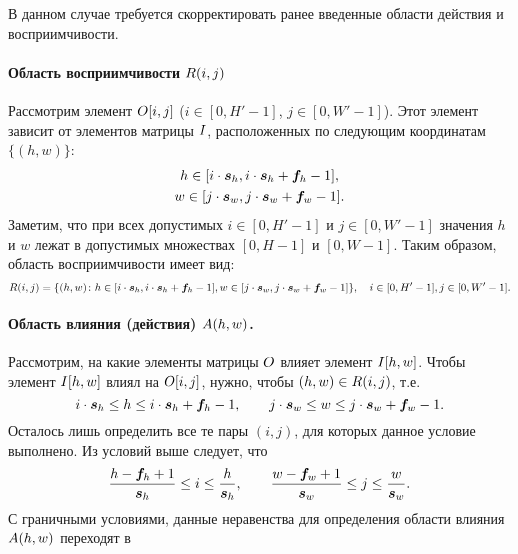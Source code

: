 \documentclass{report}
\numberwithin{theorem}{chapter}
\numberwithin{statement}{chapter}
\numberwithin{lemma}{chapter}
\theoremstyle{definition}
\numberwithin{task}{chapter}
\theoremstyle{remark}
\numberwithin{example}{chapter}
\theoremstyle{definition}
\numberwithin{definition}{chapter}
\theoremstyle{remark}
\theoremstyle{remark}
\numberwithin{lyrics}{section}
\begin{document}
В данном случае требуется скорректировать ранее введенные области действия и восприимчивости.

\paragraph{Область восприимчивости $R(i, j)$}
Рассмотрим элемент $O[i, j]$ ($i \in [0, H'- 1]$, $j \in [0, W' - 1]$). Этот элемент зависит от элементов матрицы $I$, расположенных по следующим координатам $\{(h, w)\}$:
\begin{gather*}
h \in [i \cdot \boldsymbol{s}_h, i \cdot \boldsymbol{s}_h + \boldsymbol{f}_h - 1], \\
w \in [j \cdot \boldsymbol{s}_w, j \cdot \boldsymbol{s}_w + \boldsymbol{f}_w - 1].
\end{gather*}
Заметим, что при всех допустимых $i \in [0, H'- 1]$ и $j \in [0, W' - 1]$ значения $h$ и $w$ лежат в допустимых множествах $[0, H - 1]$ и $[0, W - 1]$. Таким образом, область восприимчивости имеет вид:
\begin{equation}
R(i, j) = \{(h, w)\colon h \in [i \cdot \boldsymbol{s}_h, i \cdot \boldsymbol{s}_h + \boldsymbol{f}_h - 1], w \in [j \cdot \boldsymbol{s}_w, j \cdot \boldsymbol{s}_w + \boldsymbol{f}_w - 1]\}, \quad i \in [0, H'- 1], j \in [0, W' - 1].
\end{equation}

\paragraph{Область влияния (действия) $A(h, w)$.}
Рассмотрим, на какие элементы матрицы $O$ влияет элемент $I[h, w]$. Чтобы элемент $I[h, w]$ влиял на $O[i, j]$, нужно, чтобы $(h, w) \in R(i, j)$, т.е.
\begin{equation}
i \cdot \boldsymbol{s}_h \le h \le i \cdot \boldsymbol{s}_h + \boldsymbol{f}_h - 1, \qquad j \cdot \boldsymbol{s}_w \le w \le j \cdot \boldsymbol{s}_w + \boldsymbol{f}_w - 1.
\end{equation}
Осталось лишь определить все те пары $(i, j)$, для которых данное условие выполнено. 
Из условий выше следует, что
\begin{equation}
\frac{h - \boldsymbol{f}_h + 1}{\boldsymbol{s}_h} \le i \le \frac{h}{\boldsymbol{s}_h}, \qquad \frac{w - \boldsymbol{f}_w + 1}{\boldsymbol{s}_w} \le j \le \frac{w}{\boldsymbol{s}_w}. 
\end{equation}
С граничными условиями, данные неравенства для определения области влияния $A(h, w)$ переходят в
\end{document}
